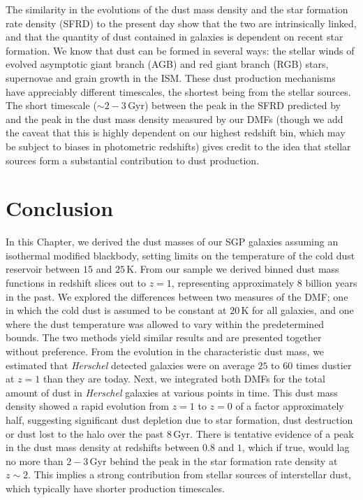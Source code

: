 The similarity in the evolutions of the dust mass density and the star formation rate density (SFRD) to the present day show that the two are intrinsically linked, and that the quantity of dust contained in galaxies is dependent on recent star formation. We know that dust can be formed in several ways: the stellar winds of evolved asymptotic giant branch (AGB) and red giant branch (RGB) stars, supernovae and grain growth in the ISM. These dust production mechanisms have appreciably different timescales, the shortest being from the stellar sources. The short timescale ($\sim 2 - 3\,$Gyr) between the peak in the SFRD predicted by \citealt{Madau_2014} and the peak in the dust mass density measured by our DMFs (though we add the caveat that this is highly dependent on our highest redshift bin, which may be subject to biases in photometric redshifts) gives credit to the idea that stellar sources form a substantial contribution to dust production. 

\section{Conclusion}

In this Chapter, we derived the dust masses of our SGP galaxies assuming an isothermal modified blackbody, setting limits on the temperature of the cold dust reservoir between $15$ and $25\,$K. From our sample we derived binned dust mass functions in redshift slices out to $z = 1$, representing approximately $8$ billion years in the past. We explored the differences between two measures of the DMF; one in which the cold dust is assumed to be constant at $20\,$K for all galaxies, and one where the dust temperature was allowed to vary within the predetermined bounds. The two methods yield similar results and are presented together without preference. From the evolution in the characteristic dust mass, we estimated that \textit{Herschel} detected galaxies were on average $25$ to $60$ times dustier at $z = 1$ than they are today. Next, we integrated both DMFs for the total amount of dust in \textit{Herschel} galaxies at various points in time. This dust mass density showed a rapid evolution from $z = 1$ to $z = 0$ of a factor approximately half, suggesting significant dust depletion due to star formation, dust destruction or dust lost to the halo over the past $8\,$Gyr. There is tentative evidence of a peak in the dust mass density at redshifts between $0.8$ and $1$, which if true, would lag no more than $2 - 3\,$Gyr behind the peak in the star formation rate density at $z \sim 2$. This implies a strong contribution from stellar sources of interstellar dust, which typically have shorter production timescales. 

